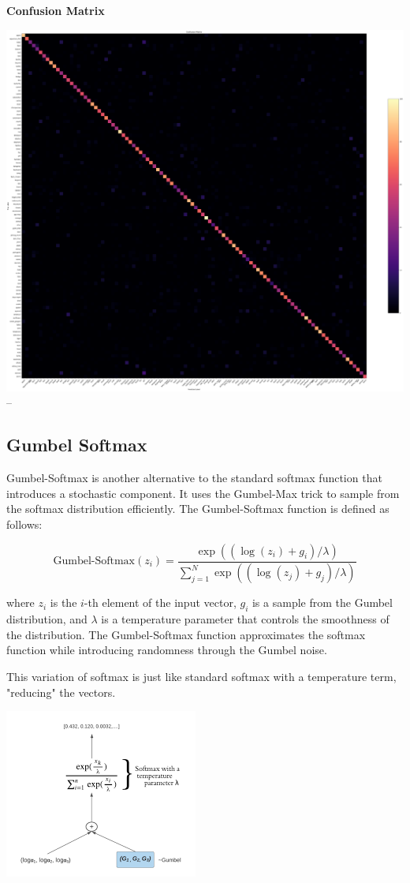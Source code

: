 \documentclass{article}
\begin{document}
\textbf{Confusion Matrix}

\includegraphics[width=0.9\linewidth]{images/LogSoftmax/highres-logsoftmax.png}
--

\subsection{Gumbel Softmax}

Gumbel-Softmax\cite{gumbel} is another alternative to the standard softmax function that introduces a stochastic component. It uses the Gumbel-Max trick to sample from the softmax distribution efficiently. The Gumbel-Softmax function is defined as follows:

\[
\text{Gumbel-Softmax}(z_i) = \frac{\exp((\log(z_i) + g_i)/\lambda)}{\sum_{j=1}^{N}\exp((\log(z_j) + g_j)/\lambda)}
\]

where \(z_i\) is the \(i\)-th element of the input vector, \(g_i\) is a sample from the Gumbel distribution, and \(\lambda\) is a temperature parameter that controls the smoothness of the distribution. The Gumbel-Softmax function approximates the softmax function while introducing randomness through the Gumbel noise.

This variation of softmax is just like standard softmax with a temperature term, "reducing" the vectors.

\includegraphics{images/lolgumbelsoftmax.png}
\end{document}
